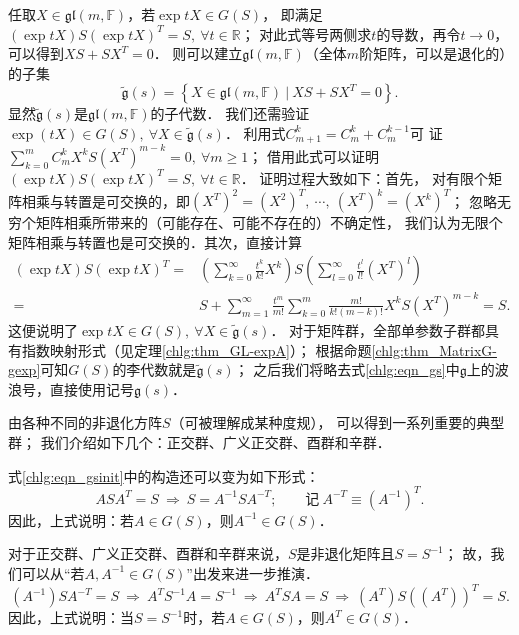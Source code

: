 任取$X\in \mathfrak{gl}(m,\mathbb{F})$，若$\exp tX \in G(S)$，
即满足$(\exp tX) S (\exp t{X})^T = S, \ \forall t\in \mathbb{R} $；
对此式等号两侧求$t$的导数，再令$t\to 0$，可以得到$X S + S {X}^T = 0 $．
则可以建立$\mathfrak{gl}(m,\mathbb{F})$（全体$m$阶矩阵，可以是退化的）的子集
\begin{equation} \label{chlg:eqn_gs}
    \tilde{\mathfrak{g}}(s) = \left\{ X \in \mathfrak{gl}(m,\mathbb{F}) \ |\ 
       X S + S {X}^T = 0 \right\} .
\end{equation}
显然$\tilde{\mathfrak{g}}(s)$是$\mathfrak{gl}(m,\mathbb{F})$的子代数．
我们还需验证$\exp(tX)\in G(S),\ \forall X \in \tilde{\mathfrak{g}}(s)$．%
利用式$C_{m + 1}^k = C_m^k + C_m^{k - 1}$可
证$ \sum_{k=0}^{m}C^k_m X^k S ({X}^T)^{m-k} =0, \ \forall m\geqslant 1 $；
借用此式可以证明$(\exp tX) S (\exp t{X})^T = S, \ \forall t\in \mathbb{R}$．
证明过程大致如下：首先，
对有限个矩阵相乘与转置是可交换的，即$(X^T)^2 = (X^2)^T,\ \cdots,\ (X^T)^k = (X^k)^T$；
忽略无穷个矩阵相乘所带来的（可能存在、可能不存在的）不确定性，
我们认为无限个矩阵相乘与转置也是可交换的．其次，直接计算
\begin{align*}
    (\exp tX) S (\exp t{X})^T = & \left(\sum_{k=0}^{\infty}\frac{t^k}{k!}X^k\right)
    S\left(\sum_{l=0}^{\infty}\frac{t^l}{l!}({X}^T)^l\right) \\
    =& S + \sum_{m=1}^{\infty}\frac{t^m}{m!} \sum_{k=0}^{m}
    \frac{m!}{k!(m-k)!} X^k S ({X}^T)^{m-k} =S .
\end{align*}
这便说明了$\exp tX \in G(S),\ \forall X\in \tilde{\mathfrak{g}}(s)$．
对于矩阵群，全部单参数子群都具有指数映射形式（见定理\ref{chlg:thm_GL-expA}）；
根据命题\ref{chlg:thm_MatrixG-gexp}可知$G(S)$的李代数就是$\tilde{\mathfrak{g}}(s)$；
之后我们将略去式\eqref{chlg:eqn_gs}中$\mathfrak{g}$上的波浪号，直接使用记号$\mathfrak{g}(s)$．



由各种不同的非退化方阵$S$（可被理解成某种度规），
可以得到一系列重要的典型群；
我们介绍如下几个：正交群、广义正交群、酉群和辛群．

式\eqref{chlg:eqn_gsinit}中的构造还可以变为如下形式：
\begin{equation}\label{chlg:eqn_invaings}
    A S {A}^T =S \ \Rightarrow \ S = A^{-1} S {A^{-T}} ; \qquad
    \text{记}\  A^{-T}\equiv ({A^{-1}})^T .
\end{equation}
因此，上式说明：若$A\in G(S)$，则$A^{-1} \in G(S)$．

对于正交群、广义正交群、酉群和辛群来说，$S$是非退化矩阵且$S=S^{-1}$；
故，我们可以从“若$A, A^{-1}\in G(S)$”出发来进一步推演．
\begin{equation*} %
    (A^{-1}) S {A^{-T}} =S \ \Rightarrow \ 
    {A}^T S^{-1} A = S^{-1} \ \Rightarrow \ {A}^T S A = S
    \ \Rightarrow \  ({A}^T) S \left({({A}^T)}\right)^T = S .
\end{equation*}
因此，上式说明：当$S=S^{-1}$时，若$A\in G(S)$，则${A}^T \in G(S)$．

